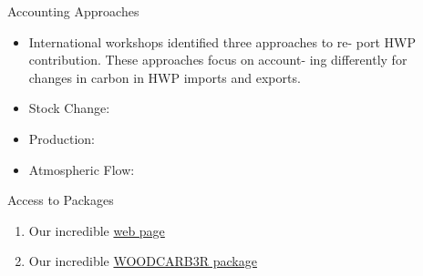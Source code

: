 \documentclass[final]{beamer}\usepackage[]{graphicx}\usepackage[]{color}
\newlength{\sepwid}
\newlength{\onecolwid}
\newlength{\twocolwid}
\begin{document}
\begin{frame}[t]
\begin{columns}[t]
\begin{column}{\onecolwid}
\begin{block}{Accounting Approaches}
\begin{itemize}
\item International workshops identified three approaches to re- port HWP contribution. These approaches focus on account- ing differently for changes in carbon in HWP imports and exports.
\item Stock Change:
\item Production:
\item Atmospheric Flow:
\end{itemize}


\end{block}
\vfill


\begin{block}{Access to Packages}

\begin{enumerate}
\item Our incredible \href{http://madeitup.com}{web page}
\item Our incredible \href{http://benjones2.github.io/WOODCARB3R/}{WOODCARB3R package}
\end{enumerate}


\end{block}
\vfill


\end{column} %

\begin{column}{\sepwid}\end{column} %

\begin{column}{\twocolwid} %

\begin{columns}[t,totalwidth=\twocolwid] %

\begin{column}{\onecolwid}\vspace{-.6in} %



\end{column}
\end{columns}
\end{column}
\end{columns}
\end{frame}
\end{document}
